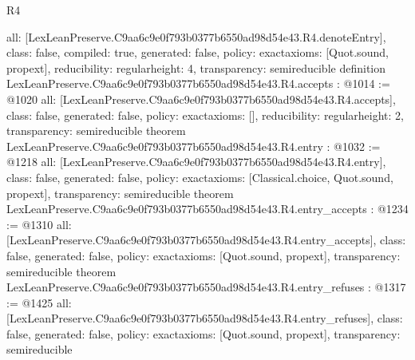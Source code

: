 \begin{lexlean}{R4}
\begin{coremodule}
{  all: [LexLeanPreserve.C9aa6c9e0f793b0377b6550ad98d54e43.R4.denoteEntry],
  class: false,
  compiled: true,
  generated: false,
  policy: exact{axioms: [Quot.sound, propext]},
  reducibility: regular{height: 4},
  transparency: semireducible
}
definition LexLeanPreserve.C9aa6c9e0f793b0377b6550ad98d54e43.R4.accepts : @1014 := @1020 {
  all: [LexLeanPreserve.C9aa6c9e0f793b0377b6550ad98d54e43.R4.accepts],
  class: false,
  generated: false,
  policy: exact{axioms: []},
  reducibility: regular{height: 2},
  transparency: semireducible
}
theorem LexLeanPreserve.C9aa6c9e0f793b0377b6550ad98d54e43.R4.entry : @1032 := @1218 {
  all: [LexLeanPreserve.C9aa6c9e0f793b0377b6550ad98d54e43.R4.entry],
  class: false,
  generated: false,
  policy: exact{axioms: [Classical.choice, Quot.sound, propext]},
  transparency: semireducible
}
theorem LexLeanPreserve.C9aa6c9e0f793b0377b6550ad98d54e43.R4.entry_accepts : @1234 := @1310 {
  all: [LexLeanPreserve.C9aa6c9e0f793b0377b6550ad98d54e43.R4.entry_accepts],
  class: false,
  generated: false,
  policy: exact{axioms: [Quot.sound, propext]},
  transparency: semireducible
}
theorem LexLeanPreserve.C9aa6c9e0f793b0377b6550ad98d54e43.R4.entry_refuses : @1317 := @1425 {
  all: [LexLeanPreserve.C9aa6c9e0f793b0377b6550ad98d54e43.R4.entry_refuses],
  class: false,
  generated: false,
  policy: exact{axioms: [Quot.sound, propext]},
  transparency: semireducible
}


\end{coremodule}
\end{lexlean}
